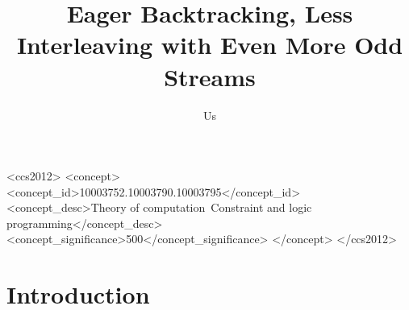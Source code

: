 \documentclass[screen,anonymous,review,draft,natbib=false]{acmart} %
\begin{document}
\title{Eager Backtracking, Less Interleaving with Even More Odd Streams}

\author{Us}



\begin{abstract}
\end{abstract}

\begin{CCSXML}
<ccs2012>
   <concept>
       <concept_id>10003752.10003790.10003795</concept_id>
       <concept_desc>Theory of computation~Constraint and logic programming</concept_desc>
       <concept_significance>500</concept_significance>
       </concept>
 </ccs2012>
\end{CCSXML}




\maketitle




\section{Introduction}\label{sec:intro}
\end{document}
